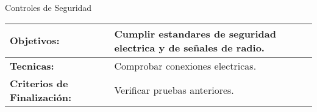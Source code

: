 \newpage
Controles de Seguridad

\begin{center}
   \begin{tabular}{|p{5cm}|p{10cm}|}
     \hline
     \textbf{Objetivos:} & Cumplir estandares de seguridad electrica y de señales de radio. \\ \hline
     \textbf{Tecnicas:} & Comprobar conexiones electricas. \\ \hline
     \textbf{Criterios de \newline Finalización:} & Verificar pruebas anteriores. \\ \hline
   \end{tabular}
\end{center}


